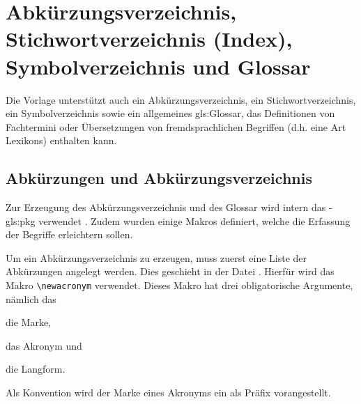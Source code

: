\section{Abkürzungsverzeichnis, Stichwortverzeichnis (Index), Symbolverzeichnis und Glossar}%
%
%
%
%
\label{sec:Glossare}
%
Die Vorlage unterstützt auch ein Abkürzungsverzeichnis, ein Stichwortverzeichnis,
ein Symbolverzeichnis sowie ein allgemeines \gls{gls:Glossar},
das Definitionen von Fachtermini oder
Übersetzungen von fremdsprachlichen Begriffen
(d.h. eine Art Lexikons) enthalten kann.


\subsection{Abkürzungen und Abkürzungsverzeichnis}%
%
%
\label{sec:Akronyme}
Zur Erzeugung des Abkürzungsverzeichnis und des Glossar wird intern das
-\gls{gls:pkg} verwendet \cite{talbot2014}.
Zudem wurden einige Makros definiert, welche die Erfassung der Begriffe erleichtern sollen.

Um ein Abkürzungsverzeichnis zu erzeugen, muss zuerst eine Liste der Abkürzungen angelegt werden.
Dies geschieht in der Datei .
Hierfür wird das Makro \lstinline|\newacronym| verwendet.
Dieses Makro hat drei obligatorische Argumente, nämlich das
\begin{itemize*}
\item die Marke,
\item das Akronym und
\item die Langform.
\end{itemize*}

Als Konvention wird der Marke eines Akronyms ein  als Präfix vorangestellt.

\begin{latex}[caption={Definition einer Abkürzung},label={lst:SimpleAcronymEntry}]
\end{latex}

